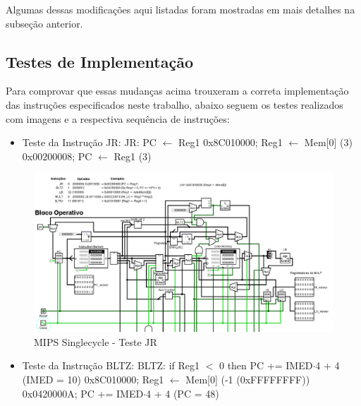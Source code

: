 \documentclass{report}
\begin{document}
        Algumas dessas modificações aqui listadas foram mostradas em mais detalhes na subseção anterior.

        \clearpage
        \subsection{Testes de Implementação}

        Para comprovar que essas mudanças acima trouxeram a correta implementação das instruções especificados neste trabalho,
        abaixo seguem os testes realizados com imagens e a respectiva sequência de instruções:
        
        \begin{itemize}
            \item Teste da Instrução JR:
                \subitem JR: PC $\leftarrow$ Reg1
                \subitem 0x8C010000; Reg1 $\leftarrow$ Mem[0] (3)
                \subitem 0x00200008; PC $\leftarrow$ Reg1 (3)
        \end{itemize}

        \begin{figure}[h!]
            \centering
            \includegraphics[width=\linewidth]{images/prints/Monocycle/Teste JR.png}
            \caption{\label{print:singlecycle_test_JR} MIPS Singlecycle - Teste JR}
        \end{figure}

        \begin{itemize}
            \item Teste da Instrução BLTZ:
                \subitem BLTZ: if Reg1 $<$ 0 then PC += IMED$\cdot$4 + 4 (IMED = 10)
                \subitem 0x8C010000; Reg1 $\leftarrow$ Mem[0] (-1 (0xFFFFFFFF))
                \subitem 0x0420000A; PC += IMED$\cdot$4 + 4 (PC = 48)
        \end{itemize}
\end{document}
